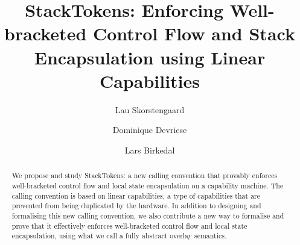 \documentclass[acmsmall,review,anonymous]{acmart}\settopmatter{printfolios=true,printccs=false,printacmref=false}
\begin{document}
\title{StackTokens: Enforcing Well-bracketed Control Flow and Stack Encapsulation using Linear Capabilities}


\author{Lau Skorstengaard}

\author{Dominique Devriese}

\author{Lars Birkedal}

\begin{abstract}
  We propose and study StackTokens: a new calling convention that provably enforces well-bracketed control flow and local state encapsulation on a capability machine.
  The calling convention is based on linear capabilities, a type of capabilities that are prevented from being duplicated by the hardware.
  In addition to designing and formalising this new calling convention, we also contribute a new way to formalise and prove that it effectively enforces well-bracketed control flow and local state encapsulation, using what we call a fully abstract overlay semantics.
\end{abstract}


\end{document}
